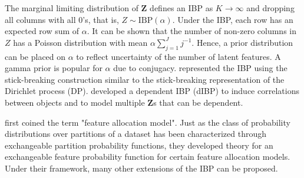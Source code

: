 \documentclass[12pt,]{article}
\def\Z{\bm{Z}}
\begin{document}
The marginal limiting distribution of $\Z$ defines an IBP as $K \rightarrow
\infty$ and dropping all columns with all 0's, that is,  \(Z \sim
\text{IBP}(\alpha)\).
Under the IBP, each row has an expected row sum of $\alpha$.
% 
%
It can be shown that the number of non-zero columns in $Z$ has a Poisson
distribution with mean $\alpha \sum_{j=1}^J j^{-1}$. Hence, a prior
distribution can be placed on \(\alpha\) to reflect uncertainty of the number
of latent features. A gamma prior is popular for $\alpha$ due to conjugacy.
\cite{teh2007stick} represented the IBP using the stick-breaking construction
similar to the stick-breaking representation of the Dirichlet process (DP).
\cite{williamson2010dependent} developed a dependent IBP (dIBP) to induce
correlations between objects and to model multiple $\Z$s that can be dependent.

%
%
% 
%


\cite{broderick2015combinatorial} first coined the term "feature allocation
model". Just as the class of probability distributions over partitions of a
dataset has been characterized through exchangeable partition probability
functions, they developed theory for an exchangeable feature probability
function for certain feature allocation models. Under their framework,
many other extensions of the IBP can be proposed.
\end{document}
